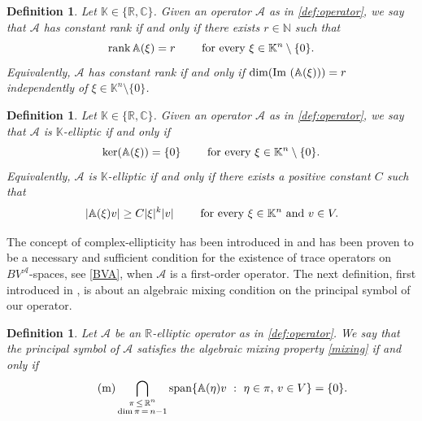 \documentclass[11pt,reqno]{amsart}
\theoremstyle{plain}
\newtheorem{definition}[theorem]{Definition}
\theoremstyle{definition}
\theoremstyle{remark}
\numberwithin{equation}{section}
\newcommand{\R}{\mathbb{R}}
\newcommand{\C}{\mathbb{C}}
\newcommand{\K}{\mathbb{K}}
\newcommand{\N}{\mathbb{N}}
\newcommand{\A}{\mathcal{A}}
\renewcommand{\AA}{\mathbb{A}}
\newcommand{\1}{\mathbbm{1}} %
\newcommand{\rank}{\textnormal{rank}}
\newcommand{\Span}{\textnormal{span}}
\newcommand{\st}{\ : \ }
\newcommand{\Ima}{\textnormal{Im }}
\begin{document}
\begin{definition}
    Let $\K \in \{\R, \C\}$. Given an operator $\A$ as in \eqref{def:operator}, we say that $\A$ has constant rank if and only if there exists $r \in \N$ such that
    \begin{equation*}
        \rank \, \AA(\xi) = r \qquad \textnormal{ for every } \xi \in \K^n \setminus \{0\}.
    \end{equation*}
    Equivalently, $\A$ has constant rank if and only if $\dim(\Ima(\AA(\xi))) = r$ independently of $\xi \in \K^n \setminus\{0\}$.
\end{definition}

\begin{definition}
    Let $\K \in \{\R, \C\}$. Given an operator $\A$ as in \eqref{def:operator}, we say that $\A$ is $\K$-elliptic if and only if
    \begin{equation*}
        \ker(\AA(\xi)) = \{0\} \qquad \textnormal{ for every } \xi \in \K^n \setminus \{0\}.
    \end{equation*}
    Equivalently, $\A$ is $\K$-elliptic if and only if there exists a positive constant $C$ such that
    \begin{equation*}
        |\AA(\xi)v| \ge C |\xi|^k|v| \qquad \textnormal{ for every } \xi \in \K^n \textnormal{ and } v \in V.
    \end{equation*}
\end{definition}

The concept of complex-ellipticity has been introduced in \cite{S61,S70} and has been proven to be a necessary and sufficient condition for the existence of trace operators on $BV^\A$-spaces, see \eqref{BVA}, when $\A$ is a first-order operator. The next definition, first introduced in \cite{SVS19}, is about an algebraic mixing condition on the principal symbol of our operator.

\begin{definition}
    Let $\A$ be an $\R$-elliptic operator as in \eqref{def:operator}. We say that the principal symbol of $\A$ satisfies the algebraic mixing property \eqref{mixing} if and only if
    \begin{equation}
    \label{mixing}\tag{m}
        \bigcap_{\substack{\pi \, \leq\,  \R^n \\  \dim{\pi}\, =\, n-1}} \Span\{ \AA(\eta)v \st \eta \in \pi, \, v \in V \} = \{0\}.
    \end{equation}
\end{definition}
\end{document}
